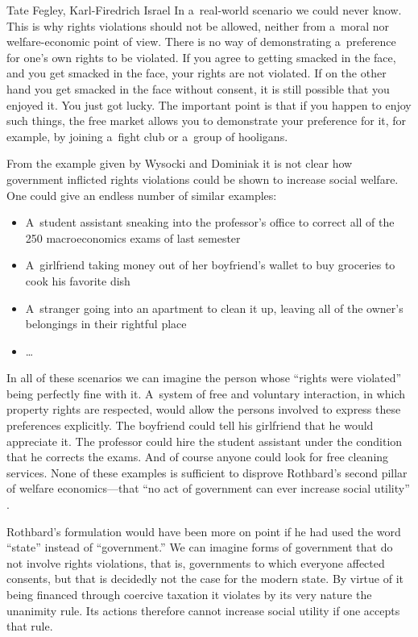\begin{artengenv2auth}{Tate Fegley, Karl-Firedrich Israel}
In a~real-world scenario we could never know. This is why rights violations should not be allowed, neither from a~moral nor welfare-economic point of view. There is no way of demonstrating a~preference for one's own rights to be violated. If you agree to getting smacked in the face, and you get smacked in the face, your rights are not violated. If on the other hand you get smacked in the face without consent, it is still possible that you enjoyed it. You just got lucky. The important point is that if you happen to enjoy such things, the free market allows you to demonstrate your preference for it, for example, by joining a~fight club or a~group of hooligans.



From the example given by Wysocki and Dominiak 
\parencite*[][]{wysocki_how_2023} %
 it is not clear how government inflicted rights violations could be shown to increase social welfare. One could give an endless number of similar examples:
\begin{itemize}
\item A~student assistant sneaking into the professor's office to correct all of the 250 macroeconomics exams of last semester
\item A~girlfriend taking money out of her boyfriend's wallet to buy groceries to cook his favorite dish
\item A~stranger going into an apartment to clean it up, leaving all of the owner's belongings in their rightful place
\item …
\end{itemize}
In all of these scenarios we can imagine the person whose ``rights were violated'' being perfectly fine with it. A~system of free and voluntary interaction, in which property rights are respected, would allow the persons involved to express these preferences explicitly. The boyfriend could tell his girlfriend that he would appreciate it. The professor could hire the student assistant under the condition that he corrects the exams. And of course anyone could look for free cleaning services. None of these examples is sufficient to disprove Rothbard's second pillar of welfare economics---that ``no act of government can ever increase social utility'' 
\parencite[][p.323]{rothbard_toward_2011}.%




Rothbard's formulation would have been more on point if he had used the word ``state'' instead of ``government.'' We can imagine forms of government that do not involve rights violations, that is, governments to which everyone affected consents, but that is decidedly not the case for the modern state. By virtue of it being financed through coercive taxation it violates by its very nature the unanimity rule. Its actions therefore cannot increase social utility if one accepts that rule.




\end{artengenv2auth}
